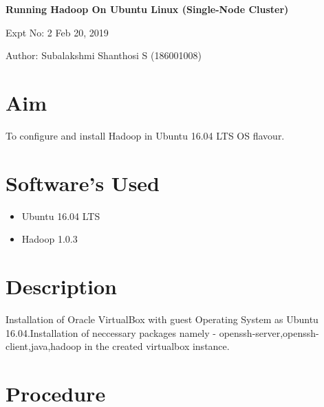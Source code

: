 \documentclass[a4paper,10pt]{article}
\begin{document}
\setcounter{secnumdepth}{-1} 

\begin{center}
\textbf{\LARGE Running Hadoop On Ubuntu Linux (Single-Node Cluster)}
\end{center}

\raggedright Expt No: 2 \hfill \raggedleft Feb  20, 2019 \\ 

\raggedright Author: Subalakshmi Shanthosi S  (186001008) \par 

\noindent\makebox[\linewidth]{\rule{\textwidth}{1pt}} 

\section{Aim}
To configure and install  Hadoop  in Ubuntu 16.04 LTS OS flavour.

\section{Software's Used}
\begin{itemize}
  \item Ubuntu  16.04 LTS
  \item Hadoop 1.0.3
\end{itemize}

\section{Description}
Installation of Oracle VirtualBox with guest Operating System as Ubuntu 16.04.Installation of neccessary packages namely - openssh-server,openssh-client,java,hadoop in the created virtualbox instance.
\section{Procedure}
\end{document}
